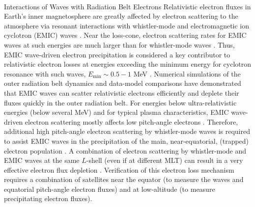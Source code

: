 \documentclass[
  letterpaper,
  DIV=11,
  numbers=noendperiod]{scrartcl}
\makeatletter
\let\oldparagraph\paragraph
\renewcommand{\paragraph}{
    \@ifstar
      \xxxParagraphStar
      \xxxParagraphNoStar
  }
\newcommand{\xxxParagraphStar}[1]{\oldparagraph*{#1}\mbox{}}
\newcommand{\xxxParagraphNoStar}[1]{\oldparagraph{#1}\mbox{}}
\makeatother
\begin{document}
\paragraph{Interactions of Waves with Radiation Belt Electrons}\label{interactions-of-waves-with-radiation-belt-electrons}
Relativistic electron fluxes in Earth's inner magnetosphere are greatly affected by electron scattering to the atmosphere via resonant interactions with whistler-mode and electromagnetic ion cyclotron (EMIC) waves \citep{millanReviewRadiationBelt2007, summersTimescalesRadiationBelt2007a}. Near the loss-cone, electron scattering rates for EMIC waves at such energies are much larger than for whistler-mode waves \citep{glauertCalculationPitchAngle2005}. Thus, EMIC wave-driven electron precipitation is considered a key contributor to relativistic electron losses at energies exceeding the minimum energy for cyclotron resonance with such waves, \(E_{\min}\sim 0.5-1\) MeV \citep{summersRelativisticElectronPitchangle2003, summersTimescalesRadiationBelt2007}. Numerical simulations of the outer radiation belt dynamics \citep{maModelingInwardDiffusion2015} and data-model comparisons \citep{angelopoulosEnergeticElectronPrecipitation2023} have demonstrated that EMIC waves can scatter relativistic electrons efficiently and deplete their fluxes quickly in the outer radiation belt.
For energies below ultra-relativistic energies (below several MeV) and for typical plasma characteristics, EMIC wave-driven electron scattering mostly affects low pitch-angle electrons \citep[equatorial \(\alpha_{eq}<30^\circ\), see][]{kerstenElectronLossesRadiation2014}. Therefore, additional high pitch-angle electron scattering by whistler-mode waves is required to assist EMIC waves in the precipitation of the main, near-equatorial, (trapped) electron population \citep{mourenasFastDropoutsMultiMeV2016}. A combination of electron scattering by whistler-mode and EMIC waves at the same \(L\)-shell (even if at different MLT) can result in a very effective electron flux depletion \citep{mourenasFastDropoutsMultiMeV2016, drozdovDepletionsMultiMeVElectrons2022}. Verification of this electron loss mechanism requires a combination of satellites near the equator (to measure the waves and equatorial pitch-angle electron fluxes) and at low-altitude (to measure precipitating electron fluxes).
\end{document}
